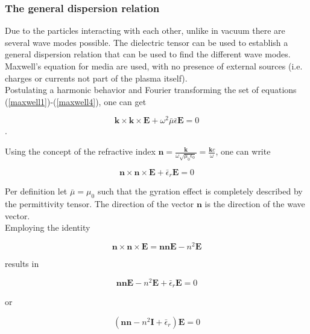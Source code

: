 \documentclass[a4paper,11pt]{article}
\begin{document}
\subsubsection{The general dispersion relation}\label{subsec_disp_rel}
Due to the particles interacting with each other, unlike in vacuum
there are several wave modes possible. The dielectric tensor can be used to establish a general dispersion
relation that can be used to find the different wave modes. Maxwell's
equation for media are used, with no presence of external sources (i.e. charges or currents not part of the plasma itself).\\

Postulating a harmonic behavior and Fourier transforming the set of equations (\ref{maxwell1})-(\ref{maxwell4}), one can get

\begin{equation}
    \mathbf{k} \times\mathbf{k} \times  \mathbf{E} + \omega^2 \bar{\mu} \bar{\epsilon}  \mathbf{E} =0
\end{equation}.

Using the concept of the refractive index $\mathbf{n}=\frac{\mathbf{k}}{\omega \sqrt{\mu_0
\epsilon_0}}=\frac{\mathbf{k}c}{\omega}$, one can write

\begin{equation}
    \mathbf{n} \times\mathbf{n} \times  \mathbf{E} +  \bar{\epsilon}_r \mathbf{E} =0
\end{equation}


Per definition let $\bar{\mu}=\mu_0$ such that the gyration effect is
completely described by the permittivity
tensor. The direction of the vector $\mathbf{n}$ is the direction of the wave vector.\\

Employing the identity

\begin{equation}
    \mathbf{n} \times \mathbf{n} \times \mathbf{E} = \mathbf{n}\mathbf{n} \mathbf{E}- n^2 \mathbf{E}
\end{equation}

results in

\begin{equation}
    \mathbf{n}\mathbf{n} \mathbf{E}- n^2   \mathbf{E} +  \bar{\epsilon}_r  \mathbf{E} =0
\end{equation}

or

\begin{equation}
    (\mathbf{n}\mathbf{n} - n^2\mathbf{I}  +  \bar{\epsilon}_r ) \mathbf{E} =0
\end{equation}
\end{document}
